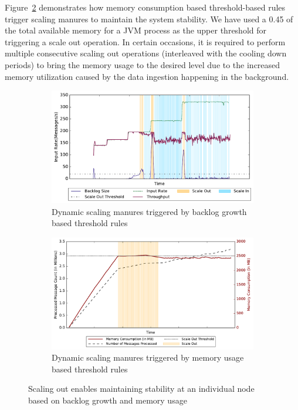Figure~\ref{fig:stability-mem} demonstrates how memory consumption based threshold-based rules trigger scaling manures to maintain the system stability.
We have used a 0.45 of the total available memory for a JVM process as the upper threshold for triggering a scale out operation.
In certain occasions, it is required to perform multiple consecutive scaling out operations (interleaved with the cooling down periods) to bring the memory usage to the desired level due to the increased memory utilization caused by the data ingestion happening in the background.
\begin{figure}[h!]
    \begin{subfigure}{0.48\textwidth}
            \centering
            \includegraphics[scale=0.42]{figures/stability_partial.pdf}
            \caption{Dynamic scaling manures triggered by backlog growth based threshold rules}
            \label{fig:stability-backlog}
    \end{subfigure}
    \begin{subfigure}{0.48\textwidth}
            \centering
            \includegraphics[scale=0.42]{figures//mem_stability.pdf} 
            \caption{Dynamic scaling manures triggered by memory usage based threshold rules}
            \label{fig:stability-mem}
    \end{subfigure}
    \caption{Scaling out enables maintaining stability at an individual node based on backlog growth and memory usage}
    \label{fig:system-stability}
\end{figure}

